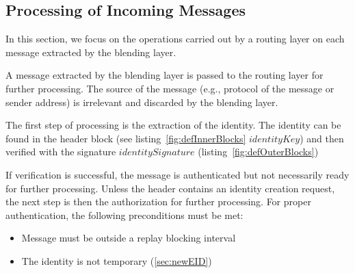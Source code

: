 

\subsection{Processing of Incoming Messages}\label{sec:processingIncommingMessages}
In this section, we focus on the operations carried out by a routing layer on each message extracted by the blending layer. 

A message extracted by the blending layer is passed to the routing layer for further processing. The source of the message (e.g., protocol of the message or sender address) is irrelevant and discarded by the blending layer. 

The first step of processing is the extraction of the identity. The identity can be found in the header block (see listing~\ref{fig:defInnerBlocks} $identityKey$) and then verified with the signature $identitySignature$ (listing~\ref{fig:defOuterBlocks})

\begin{lstfloat}[ht]
	
	\caption{Definition of the inner message blocks.}
	\label{fig:defInnerBlocks}
\end{lstfloat}

If verification is successful, the message is authenticated but not necessarily ready for further processing. Unless the header contains an identity creation request, the next step is then the authorization for further processing. For proper authentication, the following preconditions must be met:
\begin{itemize}
	\item Message must be outside a replay blocking interval
	\item The identity is not temporary (\cref{sec:newEID})
\end{itemize}

